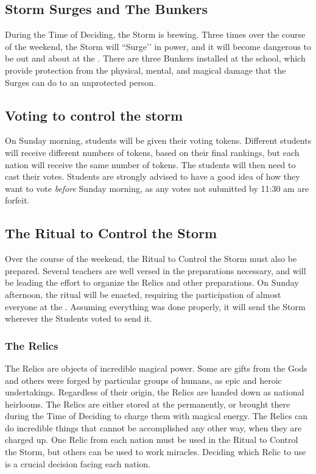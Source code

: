 \documentclass[blue]{GL2020}
\begin{document}
\subsection*{Storm Surges and The Bunkers}
During the Time of Deciding, the Storm is brewing. Three times over the course of the weekend, the Storm will ``Surge’’ in power, and it will become dangerous to be out and about at the \pSc{}. There are three Bunkers installed at the school, which provide protection from the physical, mental, and magical damage that the Surges can do to an unprotected person.

\subsection*{Voting to control the storm}
On Sunday morning, students will be given their voting tokens. Different students will receive different numbers of tokens, based on their final rankings, but each nation will receive the same number of tokens. The students will then need to cast their votes. Students are strongly advised to have a good idea of how they want to vote \emph{before} Sunday morning, as any votes not submitted by 11:30 am are forfeit.

\subsection*{The Ritual to Control the Storm}
Over the course of the weekend, the Ritual to Control the Storm must also be prepared. Several teachers are well versed in the preparations necessary, and will be leading the effort to organize the Relics and other preparations. On Sunday afternoon, the ritual will be enacted, requiring the participation of almost everyone at the \pSchool{}. Assuming everything was done properly, it will send the Storm wherever the Students voted to send it.

\subsubsection*{The Relics}
The Relics are objects of incredible magical power. Some are gifts from the Gods and others were forged by particular groups of humans, as epic and heroic undertakings. Regardless of their origin, the Relics are handed down as national heirlooms. The Relics are either stored at the \pSchool{} permanently, or brought there during the Time of Deciding to charge them with magical energy. The Relics can do incredible things that cannot be accomplished any other way, when they are charged up. One Relic from each nation must be used in the Ritual to Control the Storm, but others can be used to work miracles. Deciding which Relic to use is a crucial decision facing each nation.
\end{document}
